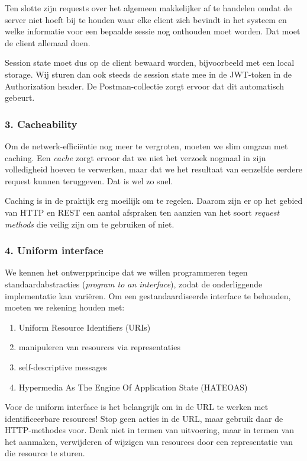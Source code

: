 Ten slotte zijn requests over het algemeen makkelijker af te handelen 
omdat de server niet hoeft bij te houden waar elke client zich bevindt 
in het systeem en welke informatie voor een bepaalde sessie nog onthouden 
moet worden. Dat moet de client allemaal doen.

Session state moet dus op de client bewaard worden, 
bijvoorbeeld met een local storage.
Wij sturen dan ook steeds de session state 
mee in de JWT-token in de Authorization header.
De Postman-collectie zorgt ervoor dat dit automatisch gebeurt.

\subsubsection{3. Cacheability}
Om de netwerk-efficiëntie nog meer te vergroten, moeten we slim 
omgaan met caching. Een \textit{cache} zorgt ervoor dat we niet 
het verzoek nogmaal in zijn volledigheid hoeven te verwerken,
maar dat we het resultaat van eenzelfde eerdere request 
kunnen teruggeven. Dat is wel zo snel.

Caching is in de praktijk erg moeilijk om te regelen. Daarom 
zijn er op het gebied van HTTP en REST een aantal afspraken ten 
aanzien van het soort \textit{request methods} die veilig zijn 
om te gebruiken of niet.

\subsubsection{4. Uniform interface}
We kennen het ontwerpprincipe dat we willen programmeren tegen 
standaardabstracties (\textit{program to an interface}), zodat 
de onderliggende implementatie kan variëren. Om een gestandaardiseerde 
interface te behouden, moeten we rekening houden met:
\begin{enumerate}
    \item Uniform Resource Identifiers (URIs)
    \item manipuleren van resources via representaties
    \item self-descriptive messages
    \item Hypermedia As The Engine Of Application State (HATEOAS)
\end{enumerate}

Voor de uniform interface is het belangrijk 
om in de URL te werken met identificeerbare 
resources! Stop geen acties in de URL, maar gebruik
daar de HTTP-methodes voor. Denk niet in termen van uitvoering,
maar in termen van het aanmaken, verwijderen of wijzigen van 
resources door een representatie van die resource te sturen. 

